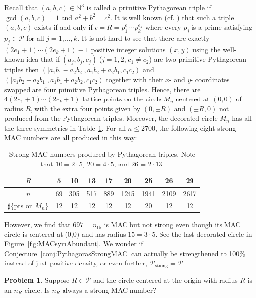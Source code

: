 \documentclass{article}
\theoremstyle{theorem}
\theoremstyle{definition}
\newtheorem{problem}[theorem]{Problem}
\begin{document}
Recall that $(a,b,c)\in{\mathbb N}^3$ is called a primitive Pythagorean triple if $\gcd(a,b,c)=1$ and $a^2+b^2=c^2$.
It is well known (cf. \cite{Silverman,Zagier1990}) that such a triple $(a,b,c)$ exists if and only if $c=R=p_1^{e_1}\cdots p_k^{e_k}$
where every $p_j$ is a prime satisfying $p_j\in {\mathcal P}$ for all $j=1,\dots,k$. It is not hard to see that there are exactly
$(2e_1+1)\cdots(2e_k+1)-1$ positive integer solutions $(x,y)$ using the well-known idea that if $(a_j,b_j,c_j)$ ($j=1,2$, $c_1\ne c_2$) are two primitive Pythagorean triples then $(|a_1b_1-a_2b_2|,a_1b_2+a_2b_1,c_1c_2)$ and  $(|a_1b_2-a_2b_1|,a_1b_1+a_2b_2,c_1c_2)$ together with their $x$- and $y$- coordinates swapped are four primitive Pythagorean triples. Hence, there are $4(2e_1+1)\cdots(2e_k+1)$ lattice points on the circle $M_n$ centered at $(0,0)$ of radius $R$, with the extra four points given by $(0,\pm R)$ and $(\pm R,0)$ not produced from the Pythagorean triples. Moreover, the decorated circle $M_n$ has all the three symmetries in Table~\ref{tbl:PythaRadius}. For all $n\le 2700$, the following eight strong MAC numbers are all produced in this way:
\begin{table}[h]
\caption{Strong MAC numbers produced by Pythagorean triples. Note that $10=2\cdot 5$, $20=4\cdot 5$, and $26=2\cdot 13$.}
\centering\begin{tabular}{|c|c|c|c|c|c|c|c|c|}
\hline
$R$ &   5 & 10 & 13 & 17 & 20   & 25   & 26 &29\\
\hline
$n$ & 69 & 305& 517 & 889 &1245 &1941 &2109 &2617 \\
\hline
$\sharp\{$pts on $M_n\}$ &   12&   12&   12&   12&   12&   20 &   12 &   12 \\
\hline
\end{tabular}
\label{tbl:PythaRadius}
\end{table}

However, we find that $697=n_{15}$ is MAC but not strong even though its MAC circle is centered at (0,0) and has radius $15=3\cdot 5$. See the last decorated circle in Figure~\ref{fig:MACsymAbundant}. We wonder if Conjecture~\ref{conj:PythagorasStrongMAC}  can actually be strengthened to 100\% instead of just positive density, or even further, ${\mathcal P}_{\text{strong}}={\mathcal P}$.

\begin{problem}
Suppose $R\in{\mathcal P}$ and the circle centered at the origin with radius $R$ is an $n_R$-circle. Is $n_R$ always a strong MAC number?
\end{problem}
\end{document}
